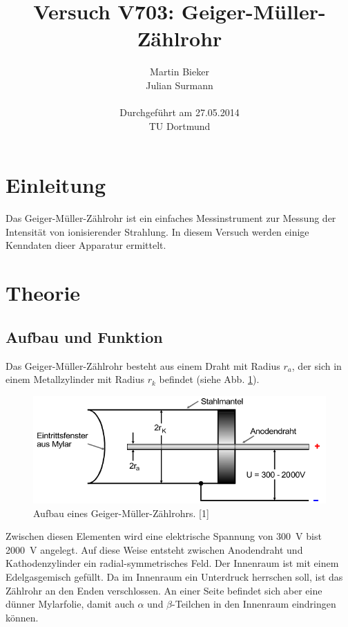 \documentclass[11pt,ngerman,a4paper]{article}
\title{\textbf{Versuch V703: Geiger-Müller-Zählrohr}}
\author{Martin Bieker\\
		Julian Surmann\\
		\\
		Durchgef\"{u}hrt am 27.05.2014\\
		TU Dortmund}
\date{}
\begin{document}
\renewcommand\tablename{Tabelle}
\renewcommand\figurename{Abbildung}
\maketitle
\thispagestyle{empty}
\newpage
\clearpage
\setcounter{page}{1}


\section{Einleitung}
Das Geiger-Müller-Zählrohr ist ein einfaches Messinstrument zur Messung der Intensität von ionisierender Strahlung. In diesem Versuch werden einige Kenndaten dieer Apparatur ermittelt.
\section{Theorie}
\subsection{Aufbau und Funktion} 
 Das Geiger-Müller-Zählrohr besteht aus einem Draht  mit Radius $r_a$, der sich in einem Metallzylinder mit Radius $r_k$ befindet (siehe Abb. \ref{abb1}). 
\begin{figure}[htp]
\centering
\includegraphics[scale=0.6]{abb1.png}
\caption{Aufbau eines Geiger-Müller-Zählrohrs. [1]}
\label{abb1}
\end{figure} 
Zwischen diesen Elementen wird eine elektrische Spannung von \SI{300}{\volt} bist \SI{2000}{\volt} angelegt. Auf diese Weise entsteht zwischen Anodendraht und Kathodenzylinder ein radial-symmetrisches Feld. Der Innenraum ist mit einem  Edelgasgemisch gefüllt. Da im Innenraum ein Unterdruck herrschen soll, ist das Zählrohr an den Enden verschlossen. An einer Seite befindet sich aber eine dünner Mylarfolie, damit  auch $\alpha$ und $\beta$-Teilchen in den Innenraum eindringen können.
 
\end{document}
